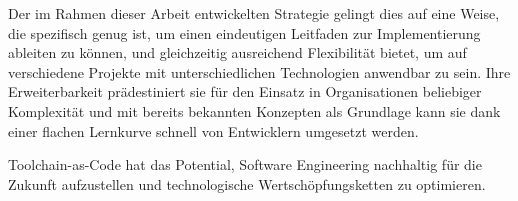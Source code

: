 Der im Rahmen dieser Arbeit entwickelten  Strategie gelingt dies auf eine Weise, die spezifisch genug ist, um einen eindeutigen Leitfaden zur Implementierung ableiten zu können, und gleichzeitig ausreichend Flexibilität bietet, um auf verschiedene Projekte mit unterschiedlichen Technologien anwendbar zu sein. Ihre Erweiterbarkeit prädestiniert sie für den Einsatz in Organisationen beliebiger Komplexität und mit bereits bekannten Konzepten als Grundlage kann sie dank einer flachen Lernkurve schnell von Entwicklern umgesetzt werden.

Toolchain-as-Code hat das Potential, Software Engineering nachhaltig für die Zukunft aufzustellen und technologische Wertschöpfungsketten zu optimieren.
